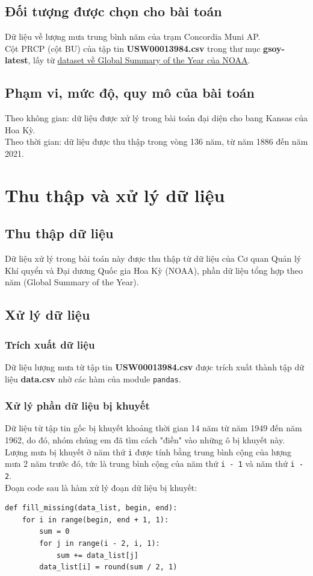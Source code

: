 \documentclass[a4paper]{article}
\begin{document}
\subsection{Đối tượng được chọn cho bài toán}
Dữ liệu về lượng mưa trung bình năm của trạm Concordia Muni AP.\\
Cột PRCP (cột BU) của tập tin \textbf{USW00013984.csv} trong thư mục \textbf{gsoy-latest}, lấy từ \href{https://www.ncei.noaa.gov/data/gsoy/archive/}{dataset về Global Summary of the Year của NOAA}.

\subsection{Phạm vi, mức độ, quy mô của bài toán}
Theo không gian: dữ liệu được xử lý trong bài toán đại diện cho bang Kansas của Hoa Kỳ.\\
Theo thời gian: dữ liệu được thu thập trong vòng 136 năm, từ năm 1886 đến năm 2021.

\section{Thu thập và xử lý dữ liệu}
\subsection{Thu thập dữ liệu}
Dữ liệu xử lý trong bài toán này được thu thập từ dữ liệu của Cơ quan Quản lý Khí quyển và Đại dương Quốc gia Hoa Kỳ (NOAA), phần dữ liệu tổng hợp theo năm (Global Summary of the Year).

\subsection{Xử lý dữ liệu}
\subsubsection{Trích xuất dữ liệu}
Dữ liệu lượng mưa từ tập tin \textbf{USW00013984.csv} được trích xuất thành tập dữ liệu \textbf{data.csv} nhờ các hàm của module \lstinline{pandas}.
\subsubsection{Xử lý phần dữ liệu bị khuyết}
Dữ liệu từ tập tin gốc bị khuyết khoảng thời gian 14 năm từ năm 1949 đến năm 1962, do đó, nhóm chúng em đã tìm cách "điền" vào những ô bị khuyết này. Lượng mưa bị khuyết ở năm thứ \lstinline{i} được tính bằng trung bình cộng của lượng mưa 2 năm trước đó, tức là trung bình cộng của năm thứ \lstinline{i - 1} và năm thứ \lstinline{i - 2}.\\
Đoạn code sau là hàm xử lý đoạn dữ liệu bị khuyết:
\begin{lstlisting}
def fill_missing(data_list, begin, end):
    for i in range(begin, end + 1, 1):
        sum = 0
        for j in range(i - 2, i, 1):
            sum += data_list[j]
        data_list[i] = round(sum / 2, 1)
\end{lstlisting}
\end{document}
